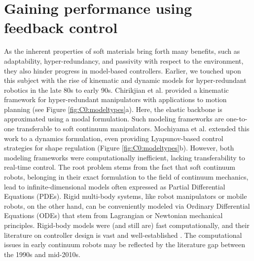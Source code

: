 \section{Gaining performance using feedback control}
\label{sec:C0:modelcontrol}
As the inherent properties of soft materials bring forth many benefits, such as adaptability, hyper-redundancy, and passivity with respect to the environment, they also hinder progress in model-based controllers. Earlier, we touched upon this subject with the rise of kinematic and dynamic models for hyper-redundant robotics in the late 80s to early 90s. Chirikjian et al. \cite{Chirikjian1992} provided a kinematic framework for hyper-redundant manipulators with applications to motion planning (see Figure \ref{fig:C0:modeltypes}a). Here, the elastic backbone is approximated using a modal formulation. Such modeling frameworks are one-to-one transferable to soft continuum manipulators. Mochiyama et al. \cite{Mochiyama1998,Mochiyama2003} extended this work to a dynamics formulation, even providing Lyapunov-based control strategies for shape regulation (Figure \ref{fig:C0:modeltypes}b). However, both modeling frameworks were computationally inefficient, lacking transferability to real-time control. The root problem stems from the fact that soft continuum robots, belonging in their exact formulation to the field of continuum mechanics, lead to infinite-dimensional models often expressed as Partial Differential Equations (PDEs). Rigid multi-body systems, like robot manipulators or mobile robots, on the other hand, can be conveniently modeled via Ordinary Differential Equations (ODEs) that stem from Lagrangian or Newtonian mechanical principles. Rigid-body models were (and still are) fast computationally, and their literature on controller design is vast and well-established \cite{Murray1994,Corke2011,Spong2006}. The computational issues in early continuum robots may be reflected by the literature gap between the 1990s and mid-2010s. 
\vspace{-3mm}
